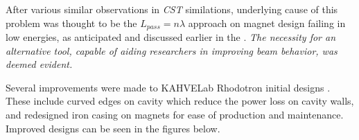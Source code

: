 \documentclass[a4paper,oneside,12pt]{report}
\numberwithin{equation}{chapter}
\begin{document}
After various similar observations in \textit{CST} similations, underlying cause of this problem was thought to be the $L_{pass} = n \lambda$ approach on magnet design failing in low energies, 
as anticipated and discussed earlier in the .
\emph{The necessity for an alternative tool, capable of aiding researchers in improving beam behavior, was deemed evident.}

Several improvements were made to KAHVELab Rhodotron initial designs \cite{sinan}. These include curved edges on cavity which reduce the power loss on cavity walls, and redesigned iron casing on magnets for ease of production and maintenance.
Improved designs can be seen in the figures below.

\end{document}
